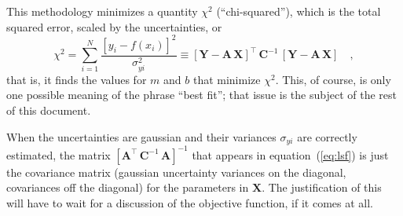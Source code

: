 \documentclass[12pt]{article}
\newcommand{\equationname}{equation}
\newcommand{\mmatrix}[1]{\boldsymbol{#1}}
\newcommand{\inverse}[1]{{#1}^{-1}}
\newcommand{\transpose}[1]{{#1}^{\scriptscriptstyle \top}}
\newcommand{\mA}{\mmatrix{A}}
\newcommand{\mAT}{\transpose{\mA}}
\newcommand{\mC}{\mmatrix{C}}
\newcommand{\mCinv}{\inverse{\mC}}
\newcommand{\mX}{\mmatrix{X}}
\newcommand{\mY}{\mmatrix{Y}}
\begin{document}
This methodology minimizes a quantity $\chi^2$ (``chi-squared''),
which is the total squared error, scaled by the uncertainties, or
\begin{equation}\label{eq:chisquared}
\chi^2
 = \sum_{i=1}^N \frac{\left[y_i - f(x_i)\right]^2}{\sigma_{yi}^2}
 \equiv \transpose{\left[\mY-\mA\,\mX\right]}
 \,\mCinv\,\left[\mY-\mA\,\mX\right]
 \quad ,
\end{equation}
that is, it finds the values for $m$ and $b$ that minimize $\chi^2$.
This, of course, is only one possible meaning of the phrase ``best
fit''; that issue is the subject of the rest of this document.

When the uncertainties are gaussian and their variances $\sigma_{yi}$
are correctly estimated, the matrix
$\inverse{\left[\mAT\,\mCinv\,\mA\right]}$ that appears in
\equationname~(\ref{eq:lsf}) is just the covariance matrix (gaussian
uncertainty variances on the diagonal, covariances off the diagonal)
for the parameters in $\mX$.  The justification of this will have to
wait for a discussion of the objective function, if it comes at all.
\end{document}
